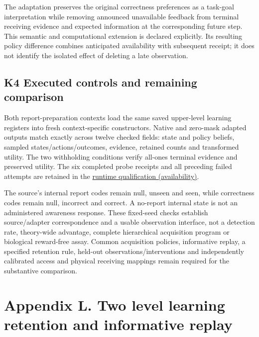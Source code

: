 \documentclass[
  american,
  11pt,
  letterpaper,
]{article}
\begin{document}
The adaptation preserves the original correctness preferences as a task-goal interpretation while removing announced unavailable feedback from terminal receiving evidence and expected information at the corresponding future step. This semantic and computational extension is declared explicitly. Its resulting policy difference combines anticipated availability with subsequent receipt; it does not identify the isolated effect of deleting a late observation.

\subsection{K4 Executed controls and remaining comparison}\label{k4-executed-controls-and-remaining-comparison}

Both report-preparation contexts load the same saved upper-level learning registers into fresh context-specific constructors. Native and zero-mask adapted outputs match exactly across twelve checked fields: state and policy beliefs, sampled states/actions/outcomes, evidence, retained counts and transformed utility. The two withholding conditions verify all-ones terminal evidence and preserved utility. The six completed probe receipts and all preceding failed attempts are retained in the \href{https://github.com/v5ma/v5ma.github.io/blob/master/papers/companions/learning-to-feel-v1.0/ARTIFACT-AVAILABILITY.md\#artifact-39}{runtime qualification (availability)}.

The source's internal report codes remain null, unseen and seen, while correctness codes remain null, incorrect and correct. A no-report internal state is not an administered awareness response. These fixed-seed checks establish source/adapter correspondence and a usable observation interface, not a detection rate, theory-wide advantage, complete hierarchical acquisition program or biological reward-free assay. Common acquisition policies, informative replay, a specified retention rule, held-out observations/interventions and independently calibrated access and physical receiving mappings remain required for the substantive comparison.

\clearpage
\hypertarget{appendix-l}{}

\section{Appendix L. Two level learning retention and informative replay}\label{appendix-l.-two-level-learning-retention-and-informative-replay}
\end{document}

